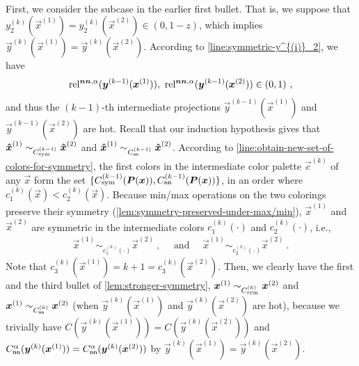 \paragraph{~~}
First, we consider the subcase in the earlier first bullet. 
That is, we suppose that $y^{(k)}_2(\vec{x}^{(1)}) = y^{(k)}_2(\vec{x}^{(2)})\in (0,1-z)$, which implies $\vec{y}^{(k)}(\vec{x}^{(1)}) = \vec{y}^{(k)}(\vec{x}^{(2)})$.
According to \cref{line:symmetric-y^{(i)}_2}, we have 
\begin{align*}
    \rela(\vec{y}^{(k-1)}(\vec{x}^{(1)})),\ \rela(\vec{y}^{(k-1)}(\vec{x}^{(2)}))\in (0,1)~,
\end{align*}
and thus the $(k-1)$-th intermediate projections $\vec{y}^{(k-1)}(\vec{x}^{(1)})$ and $\vec{y}^{(k-1)}(\vec{x}^{(2)})$ are hot.
Recall that our induction hypothesis gives that $\vec{\hat{x}}^{(1)}\sim_{\Csym{k-1}}\vec{\hat{x}}^{(2)}$ and $\vec{\hat{x}}^{(1)}\sim_{C_{\sf nn}^{(k-1)}} \vec{\hat{x}}^{(2)}$. 
According to \cref{line:obtain-new-set-of-colors-for-symmetry}, the first colors in the intermediate color palette $\vec{c}^{(k)}$ of any $\vec{x}$ form the set $\{\Csym{k-1}(\vec{P}(\vec{x})), C^{(k-1)}_{\sf nn}(\vec{P}(\vec{x}))\}$, in an order where $c_1^{(k)}(\vec{x})<c_2^{(k)}(\vec{x})$.
Because min/max operations on the two colorings preserve their symmetry (\cref{lem:symmetry-preserved-under-max/min}),
$\vec{x}^{(1)}$ and $\vec{x}^{(2)}$ are symmetric in the intermediate colors $c^{(k)}_1(\cdot)$ and $c^{(k)}_2(\cdot)$, i.e., 
\begin{align*}
    \vec{x}^{(1)} \sim_{c^{(k)}_1(\cdot)} \vec{x}^{(2)}~,
    \quad \text{ and } \quad
    \vec{x}^{(1)} \sim_{c^{(k)}_2(\cdot)} \vec{x}^{(2)}~.
\end{align*}
Note that $c_3^{(k)}(\vec{x}^{(1)})=k+1=c_3^{(k)}(\vec{x}^{(2)})$.
Then, we clearly have the first and the third bullet of \cref{lem:stronger-symmetry}, $\vec{x}^{(1)}\sim_{\Csym{k}} \vec{x}^{(2)}$ and $\vec{x}^{(1)}\sim_{C^{(k)}_{\sf nn}} \vec{x}^{(2)}$ (when $\vec{y}^{(k)}(\vec{x}^{(1)})$ and $\vec{y}^{(k)}(\vec{x}^{(2)})$ are hot), because we trivially have $C(\vec{y}^{(k)}(\vec{x}^{(1)}))=C(\vec{y}^{(k)}(\vec{x}^{(2)}))$ and $C_{\sf nn}^{\alpha}(\vec{y}^{(k)}(\vec{x}^{(1)}))=C_{\sf nn}^{\alpha}(\vec{y}^{(k)}(\vec{x}^{(2)}))$ by $\vec{y}^{(k)}(\vec{x}^{(1)})=\vec{y}^{(k)}(\vec{x}^{(2)})$.

